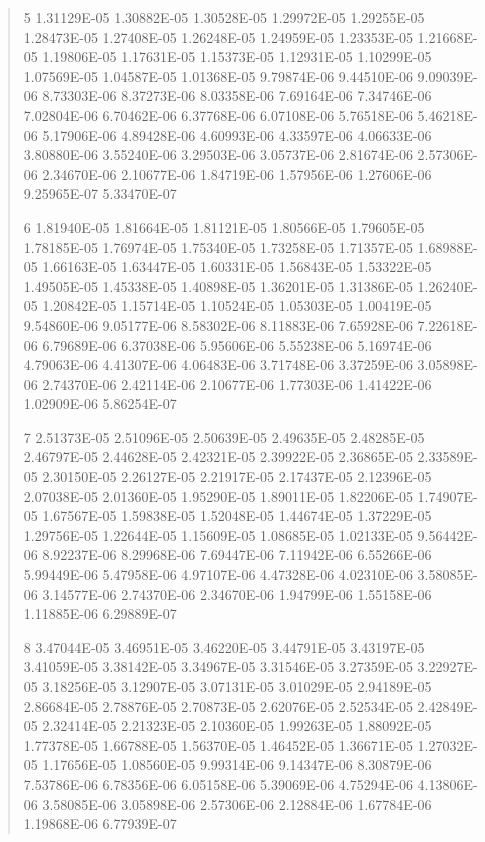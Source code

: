 \documentclass[letterpaper,10pt,english]{sphinxmanual}
\begin{document}
\begin{quote}
\begin{DUlineblock}{0em}
\begin{DUlineblock}{\DUlineblockindent}
\item[] 5   1.31129E-05  1.30882E-05  1.30528E-05  1.29972E-05  1.29255E-05  1.28473E-05  1.27408E-05  1.26248E-05  1.24959E-05  1.23353E-05  1.21668E-05  1.19806E-05  1.17631E-05  1.15373E-05  1.12931E-05  1.10299E-05  1.07569E-05  1.04587E-05  1.01368E-05  9.79874E-06  9.44510E-06  9.09039E-06  8.73303E-06  8.37273E-06  8.03358E-06  7.69164E-06  7.34746E-06  7.02804E-06  6.70462E-06  6.37768E-06  6.07108E-06  5.76518E-06  5.46218E-06  5.17906E-06  4.89428E-06  4.60993E-06  4.33597E-06  4.06633E-06  3.80880E-06  3.55240E-06  3.29503E-06  3.05737E-06  2.81674E-06  2.57306E-06  2.34670E-06  2.10677E-06  1.84719E-06  1.57956E-06  1.27606E-06  9.25965E-07  5.33470E-07
\item[] 6   1.81940E-05  1.81664E-05  1.81121E-05  1.80566E-05  1.79605E-05  1.78185E-05  1.76974E-05  1.75340E-05  1.73258E-05  1.71357E-05  1.68988E-05  1.66163E-05  1.63447E-05  1.60331E-05  1.56843E-05  1.53322E-05  1.49505E-05  1.45338E-05  1.40898E-05  1.36201E-05  1.31386E-05  1.26240E-05  1.20842E-05  1.15714E-05  1.10524E-05  1.05303E-05  1.00419E-05  9.54860E-06  9.05177E-06  8.58302E-06  8.11883E-06  7.65928E-06  7.22618E-06  6.79689E-06  6.37038E-06  5.95606E-06  5.55238E-06  5.16974E-06  4.79063E-06  4.41307E-06  4.06483E-06  3.71748E-06  3.37259E-06  3.05898E-06  2.74370E-06  2.42114E-06  2.10677E-06  1.77303E-06  1.41422E-06  1.02909E-06  5.86254E-07
\item[] 7   2.51373E-05  2.51096E-05  2.50639E-05  2.49635E-05  2.48285E-05  2.46797E-05  2.44628E-05  2.42321E-05  2.39922E-05  2.36865E-05  2.33589E-05  2.30150E-05  2.26127E-05  2.21917E-05  2.17437E-05  2.12396E-05  2.07038E-05  2.01360E-05  1.95290E-05  1.89011E-05  1.82206E-05  1.74907E-05  1.67567E-05  1.59838E-05  1.52048E-05  1.44674E-05  1.37229E-05  1.29756E-05  1.22644E-05  1.15609E-05  1.08685E-05  1.02133E-05  9.56442E-06  8.92237E-06  8.29968E-06  7.69447E-06  7.11942E-06  6.55266E-06  5.99449E-06  5.47958E-06  4.97107E-06  4.47328E-06  4.02310E-06  3.58085E-06  3.14577E-06  2.74370E-06  2.34670E-06  1.94799E-06  1.55158E-06  1.11885E-06  6.29889E-07
\item[] 8   3.47044E-05  3.46951E-05  3.46220E-05  3.44791E-05  3.43197E-05  3.41059E-05  3.38142E-05  3.34967E-05  3.31546E-05  3.27359E-05  3.22927E-05  3.18256E-05  3.12907E-05  3.07131E-05  3.01029E-05  2.94189E-05  2.86684E-05  2.78876E-05  2.70873E-05  2.62076E-05  2.52534E-05  2.42849E-05  2.32414E-05  2.21323E-05  2.10360E-05  1.99263E-05  1.88092E-05  1.77378E-05  1.66788E-05  1.56370E-05  1.46452E-05  1.36671E-05  1.27032E-05  1.17656E-05  1.08560E-05  9.99314E-06  9.14347E-06  8.30879E-06  7.53786E-06  6.78356E-06  6.05158E-06  5.39069E-06  4.75294E-06  4.13806E-06  3.58085E-06  3.05898E-06  2.57306E-06  2.12884E-06  1.67784E-06  1.19868E-06  6.77939E-07

\end{DUlineblock}
\end{DUlineblock}
\end{quote}
\end{document}
